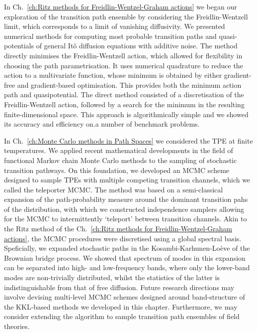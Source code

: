 \documentclass[]{cam-thesis}
\begin{document}
In Ch.~\ref{ch:Ritz methods for Freidlin-Wentzel-Graham actions} we began our exploration of the transition path ensemble by considering the Freidlin-Wentzell limit, which corresponds to a limit of vanishing diffusivity. We presented numerical methods for computing most probable transition paths and quasi-potentials of general It\^{o} diffusion equations with additive noise. The method directly minimises the Freidlin-Wentzell action, which allowed for flexibility in choosing the path parametrisation. It uses numerical quadrature to reduce the action to a multivariate function, whose minimum is obtained by either gradient-free and gradient-based optimisation. This provides both the minimum action path and quasipotential. The direct method consisted of a discretisation of the Freidlin-Wentzell action, followed by a search for the minimum in the resulting finite-dimensional space. This approach is algorithmically simple and we showed its accuracy and efficiency on.a number of benchmark problems.

In Ch.~\ref{ch:Monte Carlo methods in Path Spaces} we considered the TPE at finite temperatures. We applied recent mathematical developments in the field of functional Markov chain Monte Carlo methods to the sampling of stochastic transition pathways. On this foundation, we developed an MCMC scheme designed to sample TPEs with multiple competing transition channels, which we called the teleporter MCMC. The method was based on a semi-classical expansion of the path-probability measure around the dominant transition pahs of the distribution, with which we constructed independence samplers allowing for the MCMC to intermittently `teleport' between transition channels. Akin to the Ritz method of the Ch.~\ref{ch:Ritz methods for Freidlin-Wentzel-Graham actions}, the MCMC procedures were discretised using a global spectral basis. Speficially, we expanded stochastic paths in the Kosambi-Karhunen-Lo\`eve of the Brownian bridge process. We showed that spectrum of modes in this expansion can be separated into high- and low-frequency bands, where only the lower-band modes are non-trivially distributed, whilst the statistics of the latter is indistinguishable from that of free diffusion. Future research directions may involve devising multi-level MCMC schemes designed around band-structure of the KKL-based methods we developed in this chapter. Furthermore, we may consider extending the algorithm to sample transition path ensembles of field theories. 
\end{document}

